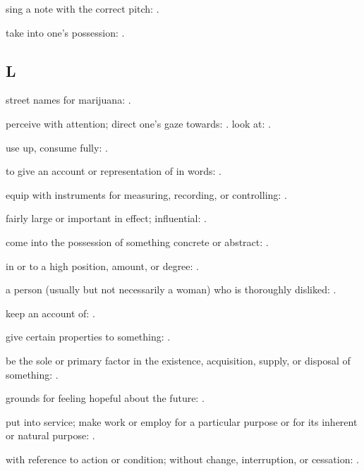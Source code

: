   sing a note with the correct pitch: .

  take into one's possession: .

\subsection*{L}

  street names for marijuana:   .

  perceive with attention; direct one's gaze towards: . look at:   .

  use up, consume fully:   .

  to give an account or representation of in words:   .

  equip with instruments for measuring, recording, or controlling: .

  fairly large or important in effect; influential: .

  come into the possession of something concrete or abstract:   .

  in or to a high position, amount, or degree: .

  a person (usually but not necessarily a woman) who is thoroughly disliked:   .

  keep an account of:   .

  give certain properties to something:   .

  be the sole or primary factor in the existence, acquisition, supply, or disposal of something: .

  grounds for feeling hopeful about the future:   .

  put into service; make work or employ for a particular purpose or for its inherent or natural purpose:   .

  with reference to action or condition; without change, interruption, or cessation: .

